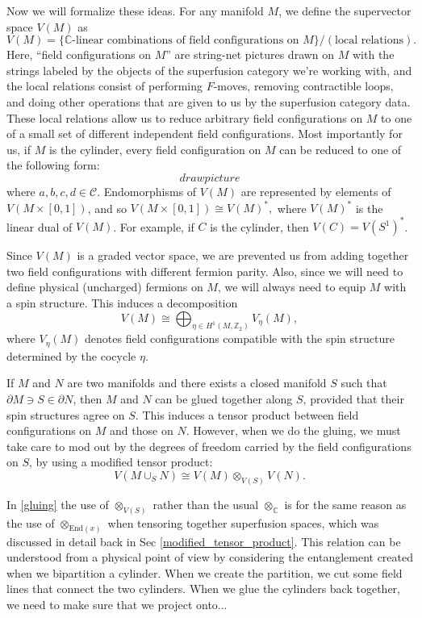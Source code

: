\documentclass[12pt,a4paper]{article}
\newcommand{\tp}{\otimes}
\newcommand{\cc}{\mathbb{C}}
\newcommand{\mcc}{\mathcal{C}}
\newcommand{\zt}{\mathbb{Z}_2}
\newcommand\be            {\begin{equation}}
\newcommand\ee            {\end{equation}}
\newcommand{\End}{\text{End}}
\newcommand{\p}{\partial}
\begin{document}
Now we will formalize these ideas. For any manifold $M$, we define the supervector space $V(M)$ as 
\be V(M) = \{\text{$\cc$-linear combinations of field configurations on $M$}\} / (\text{local relations}). \ee
Here, ``field configurations on $M$'' are string-net pictures drawn on $M$ with the strings labeled by the objects of the superfusion category we're working with, and the local relations consist of performing $F$-moves, removing contractible loops, and doing other operations that are given to us by the superfusion category data. These local relations allow us to reduce arbitrary field configurations on $M$ to one of a small set of different independent field configurations. Most importantly for us, if $M$ is the cylinder, every field configuration on $M$ can be reduced to one of the following form:
\be draw picture \ee
where $a,b,c,d \in \mcc$. Endomorphisms of $V(M)$ are represented by elements of $V(M\times [0,1])$, and so $V(M\times[0,1]) \cong V(M)^*,$
where $V(M)^*$ is the linear dual of $V(M)$. For example, if $C$ is the cylinder, then $V(C) = V(S^1)^*$. 

Since $V(M)$ is a graded vector space, we are prevented us from adding together two field configurations with different fermion parity. Also, since we will need to define physical (uncharged) fermions on $M$, we will always need to equip $M$ with a spin structure. This induces a decomposition 
\be V(M) \cong \bigoplus_{\eta \in H^1(M,\zt)}V_\eta(M),\ee
where $V_\eta(M)$ denotes field configurations compatible with the spin structure determined by the cocycle $\eta$. 

If $M$ and $N$ are two manifolds and there exists a closed manifold $S$ such that $\p M \ni S \in \p N$, then $M$ and $N$ can be glued together along $S$, provided that their spin structures agree on $S$. This induces a tensor product between field configurations on $M$ and those on $N$. However, when we do the gluing, we must take care to mod out by the degrees of freedom carried by the field configurations on $S$, by using a modified tensor product:
\be \label{gluing} V(M\cup_SN) \cong V(M)\tp_{V(S)} V(N).\ee

In \eqref{gluing} the use of $\tp_{V(S)}$ rather than the usual $\tp_\cc$ is for the same reason as the use of $\tp_{\End(x)}$ when tensoring together superfusion spaces, which was discussed in detail back in Sec \ref{modified_tensor_product}. This relation can be understood from a physical point of view by considering the entanglement created when we bipartition a cylinder. When we create the partition, we cut some field lines that connect the two cylinders. When we glue the cylinders back together, we need to make sure that we project onto...
\end{document}
